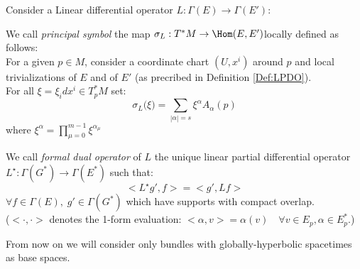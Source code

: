 \documentclass[Main]{subfiles}
\begin{document}
			Consider a Linear differential operator $L: \Gamma(E) \rightarrow \Gamma(E')$:
			\begin{definition}
			 	We call \emph{principal symbol} the map $\sigma_L: T^*M \rightarrow \Hom(E,E') $locally defined as follows: \\
			 	For a given $p\in M$, consider a coordinate chart $(U, x^i)$ around $p$ and local trivializations of $E$ and of $E'$ (as precribed in Definition \ref{Def:LPDO}).
			 	\\
			 	For all $\xi = \xi_i dx^i \in T^*_pM$ set:
			 	\begin{displaymath}
			 		\sigma_L \big(\xi \big) = \sum_{|\alpha|=s}  \xi^\alpha A_\alpha (p)
			 	\end{displaymath}
			 	where $ \xi^\alpha = \prod_{\mu=0}^{m-1} \xi^{\alpha_\mu}$
			 \end{definition}
			\begin{definition}
				We call \emph{formal dual operator} of $L$
				the unique linear partial differential operator $L^\star: \Gamma(G^*) \rightarrow \Gamma(E^*)$ such that:
				\begin{displaymath}
					<L^\star g' , f > = <g', L f>
				\end{displaymath}
				$\forall f\in \Gamma(E),\; g' \in \Gamma(G^*)$ which have supports with compact overlap.
				\\
				($<\cdot,\cdot>$ denotes the 1-form evaluation: $<\alpha,v>= \alpha(v) \quad \forall v\in E_p, \alpha \in E^*_p$.)
			\end{definition}
			\begin{NB}

				From now on we will consider only bundles with globally-hyperbolic spacetimes as base spaces.
			\end{NB}
\end{document}

